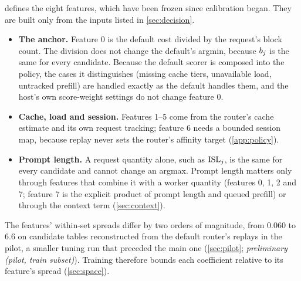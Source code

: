  defines the eight  features, which have been frozen since
calibration began. They are built only from the inputs listed in \cref{sec:decision}.
\begin{itemize}
  \item \textbf{The anchor.} Feature 0 is the default cost divided by the request's block count.
    The division does not change the default's argmin, because $b_j$ is the same for
    every candidate. Because the default scorer is composed into the policy, the cases it
    distinguishes (missing cache tiers, unavailable load, untracked prefill) are handled exactly as
    the default handles them, and the host's own score-weight settings do not change feature 0.
  \item \textbf{Cache, load and session.} Features 1--5 come from the router's cache estimate and
    its own request tracking; feature 6 needs a bounded session map, because replay never sets the
    router's affinity target (\cref{app:policy}).
  \item \textbf{Prompt length.} A request quantity alone, such as $\mathrm{ISL}_j$, is the same for every
    candidate and cannot change an argmax. Prompt length matters only through features that
    combine it with a worker quantity (features 0, 1, 2 and 7; feature 7 is the explicit product
    of prompt length and queued prefill) or through the context term (\cref{sec:context}).
\end{itemize}

The features' within-set spreads differ by two orders of magnitude, from 0.060 to 6.6 on candidate
tables reconstructed from the default router's replays in the pilot, a smaller tuning run that
preceded the main one (\cref{sec:pilot}; \emph{preliminary (pilot, train subset)}). Training
therefore bounds each coefficient relative to its feature's spread (\cref{sec:space}).


